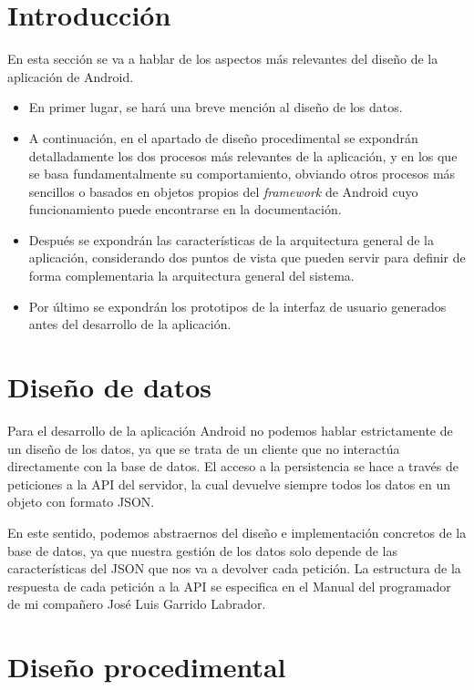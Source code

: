 
\section{Introducción}
En esta sección se va a hablar de los aspectos más relevantes del diseño de la aplicación de Android.
\begin{itemize}
	\item En primer lugar, se hará una breve mención al diseño de los datos.
	\item A continuación, en el apartado de diseño procedimental se expondrán detalladamente los dos procesos más relevantes de la aplicación, y en los que se basa fundamentalmente su comportamiento, obviando otros procesos más sencillos o basados en objetos propios del \textit{framework} de Android cuyo funcionamiento puede encontrarse en la documentación.
	\item Después se expondrán las características de la arquitectura general de la aplicación, considerando dos puntos de vista que pueden servir para definir de forma complementaria la arquitectura general del sistema. 
	\item Por último se expondrán los prototipos de la interfaz de usuario generados antes del desarrollo de la aplicación. 
\end{itemize}

\section{Diseño de datos}

Para el desarrollo de la aplicación Android no podemos hablar estrictamente de un diseño de los datos, ya que se trata de un cliente que no interactúa directamente con la base de datos. El acceso a la persistencia se hace a través de peticiones a la API del servidor, la cual devuelve siempre todos los datos en un objeto con formato JSON. 

En este sentido, podemos abstraernos del diseño e implementación concretos de la base de datos, ya que nuestra gestión de los datos solo depende de las características del JSON que nos va a devolver cada petición. La estructura de la respuesta de cada petición a la API se especifica en el Manual del programador de mi compañero José Luis Garrido Labrador. 

\section{Diseño procedimental}

